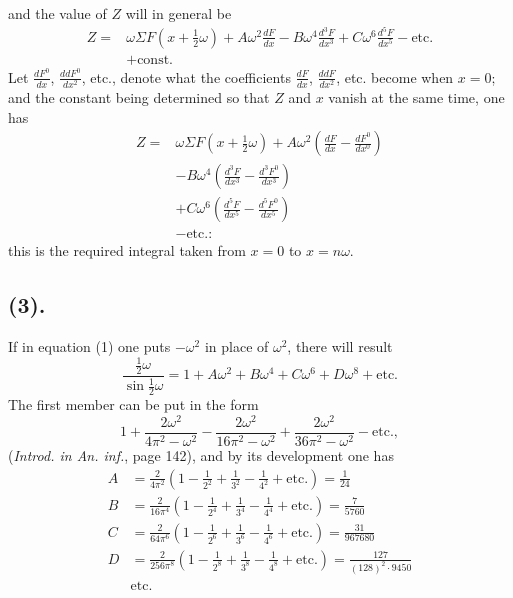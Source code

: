 \documentclass{article}
\begin{document}
and the value of $Z$ will in general be
\[ \begin{aligned} Z={}&\omega\Sigma F(x+\tfrac{1}{2}\omega)+A\omega^{2}\frac{dF}{dx}-B\omega^{4}\frac{d^{3}F}{dx^{3}}+C\omega^{6}\frac{d^{5}F}{dx^{5}}-\text{etc.}\\ &+\text{const.} \end{aligned} \]
Let $\frac{dF^{0}}{dx}$, $\frac{ddF^{0}}{dx^{2}}$, etc., denote what the coefficients $\frac{dF}{dx}$, $\frac{ddF}{dx^{2}}$, etc. become when $x=0$; and the constant being determined so that $Z$ and $x$ vanish at the same time, one has
\[ \begin{aligned} Z={}&\omega\Sigma F(x+\tfrac{1}{2}\omega)+A\omega^{2}\left(\frac{dF}{dx}-\frac{dF^{0}}{dx^{0}}\right)\\ &-B\omega^{4}\left(\frac{d^{3}F}{dx^{3}}-\frac{d^{3}F^{0}}{dx^{3}}\right)\\ &+C\omega^{6}\left(\frac{d^{5}F}{dx^{5}}-\frac{d^{5}F^{0}}{dx^{5}}\right)\\ &-\text{etc.}: \end{aligned} \tag{2} \]
this is the required integral taken from $x=0$ to $x=n\omega$.

\subsection*{(3).}

If in equation (1) one puts $-\omega^{2}$ in place of $\omega^{2}$, there will result
\[ \frac{\tfrac{1}{2}\omega}{\sin\tfrac{1}{2}\omega}=1+A\omega^{2}+B\omega^{4}+C\omega^{6}+D\omega^{8}+\text{etc.} \]
The first member can be put in the form
\[ 1+\frac{2\omega^{2}}{4\pi^{2}-\omega^{2}}-\frac{2\omega^{2}}{16\pi^{2}-\omega^{2}}+\frac{2\omega^{2}}{36\pi^{2}-\omega^{2}}-\text{etc.}, \]
(\emph{Introd. in An. inf.}, page 142), and by its development one has
\[ \begin{aligned} A&=\frac{2}{4\pi^{2}}\left(1-\frac{1}{2^{2}}+\frac{1}{3^{2}}-\frac{1}{4^{2}}+\text{etc.}\right)=\frac{1}{24}\\ B&=\frac{2}{16\pi^{4}}\left(1-\frac{1}{2^{4}}+\frac{1}{3^{4}}-\frac{1}{4^{4}}+\text{etc.}\right)=\frac{7}{5760}\\ C&=\frac{2}{64\pi^{6}}\left(1-\frac{1}{2^{6}}+\frac{1}{3^{6}}-\frac{1}{4^{6}}+\text{etc.}\right)=\frac{31}{967680}\\ D&=\frac{2}{256\pi^{8}}\left(1-\frac{1}{2^{8}}+\frac{1}{3^{8}}-\frac{1}{4^{8}}+\text{etc.}\right)=\frac{127}{(128)^{2}\cdot9450}\\ &\text{etc.} \end{aligned} \]
\end{document}
